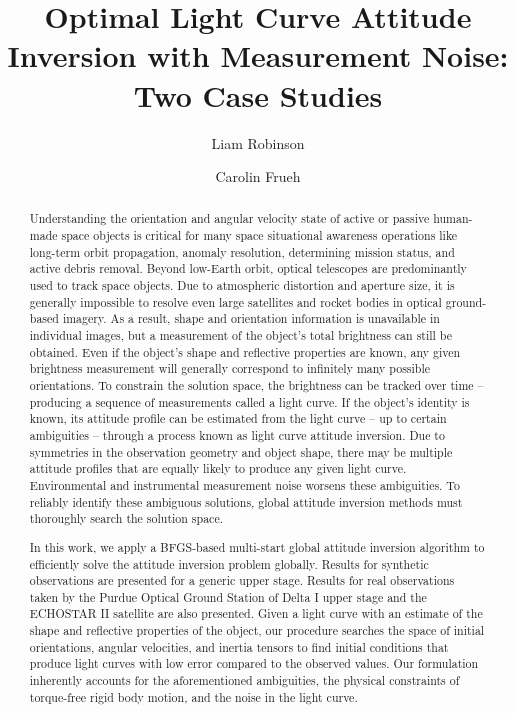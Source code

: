 \documentclass[a4paper,twocolumn]{spaceDebrisC} %
\title{Optimal Light Curve Attitude Inversion with Measurement Noise: Two Case Studies}
\author{Liam Robinson}
\author{Carolin Frueh}
\affil{Purdue University, West Lafayette, United States, Email: \texttt{\{robin502, cfrueh\}$@$purdue.edu}}
\begin{document}

\maketitle

\begin{abstract}

Understanding the orientation and angular velocity state of active or passive human-made space objects is critical for many space situational awareness operations like long-term orbit propagation, anomaly resolution, determining mission status, and active debris removal. Beyond low-Earth orbit, optical telescopes are predominantly used to track space objects. Due to atmospheric distortion and aperture size, it is generally impossible to resolve even large satellites and rocket bodies in optical ground-based imagery. As a result, shape and orientation information is unavailable in individual images, but a measurement of the object's total brightness can still be obtained. Even if the object's shape and reflective properties are known, any given brightness measurement will generally correspond to infinitely many possible orientations. To constrain the solution space, the brightness can be tracked over time -- producing a sequence of measurements called a light curve. If the object's identity is known, its attitude profile can be estimated from the light curve -- up to certain ambiguities -- through a process known as light curve attitude inversion. Due to symmetries in the observation geometry and object shape, there may be multiple attitude profiles that are equally likely to produce any given light curve. Environmental and instrumental measurement noise worsens these ambiguities. To reliably identify these ambiguous solutions, global attitude inversion methods must thoroughly search the solution space.

In this work, we apply a BFGS-based multi-start global attitude inversion algorithm to efficiently solve the attitude inversion problem globally. Results for synthetic observations are presented for a generic upper stage. Results for real observations taken by the Purdue Optical Ground Station of Delta I upper stage and the ECHOSTAR II satellite are also presented. Given a light curve with an estimate of the shape and reflective properties of the object, our procedure searches the space of initial orientations, angular velocities, and inertia tensors to find initial conditions that produce light curves with low error compared to the observed values. Our formulation inherently accounts for the aforementioned ambiguities, the physical constraints of torque-free rigid body motion, and the noise in the light curve.

\end{abstract}
\end{document}
